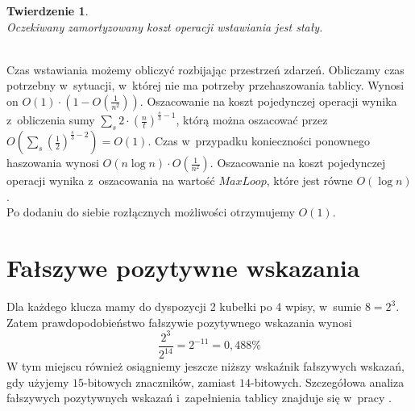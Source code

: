 \documentclass[declaration,shortabstract,masc]{iithesis}
\newtheorem{Tw}{Twierdzenie}
\newcommand{\btw}{\begin{Tw}~\\\normalfont\indent}
\newcommand{\etw}{\end{Tw}\medskip}
\newcommand{\bsd}{\begin{ProofSketch}~\\\normalfont\indent}
\newcommand{\esd}{\end{ProofSketch}}
\begin{document}
				\btw
					Oczekiwany zamortyzowany koszt operacji wstawiania jest stały.
				\etw
				\bsd
					Czas wstawiania możemy obliczyć rozbijając przestrzeń zdarzeń. Obliczamy czas potrzebny w~sytuacji, w~której nie ma potrzeby przehaszowania tablicy. Wynosi on $O(1)\cdot\left(1 - O\left(\frac{1}{n^2}\right)\right)$. Oszacowanie na koszt pojedynczej operacji wynika z~obliczenia sumy $\displaystyle\sum_s 2\cdot\left(\frac{n}{t}\right)^{\frac{s}{3} - 1}$, którą można oszacować przez $O\left(\displaystyle\sum_s\left(\frac{1}{2}\right)^{\frac{s}{3} - 2}\right) = O(1)$. Czas w~przypadku konieczności ponownego haszowania wynosi $O(n\log n)\cdot O\left(\frac{1}{n^2}\right)$. Oszacowanie na koszt pojedynczej operacji wynika z~oszacowania na wartość $MaxLoop$, które jest równe $O(\log n)$.\\
					\indent Po dodaniu do siebie rozłącznych możliwości otrzymujemy $O(1)$.
				\esd
		\section{Fałszywe pozytywne wskazania}
			Dla każdego klucza mamy do dyspozycji 2 kubełki po 4 wpisy, w~sumie $8=2^3$. Zatem prawdopodobieństwo fałszywie pozytywnego wskazania wynosi
			$$\frac{2^3}{2^{14}} = 2^{-11} = 0,488\%$$
			W tym miejscu również osiągniemy jeszcze niższy wskaźnik fałszywych wskazań, gdy użyjemy $15$-bitowych znaczników, zamiast $14$-bitowych. Szczegółowa analiza fałszywych pozytywnych wskazań i~zapełnienia tablicy znajduje się w~pracy \cite{PKCH}.
\end{document}

